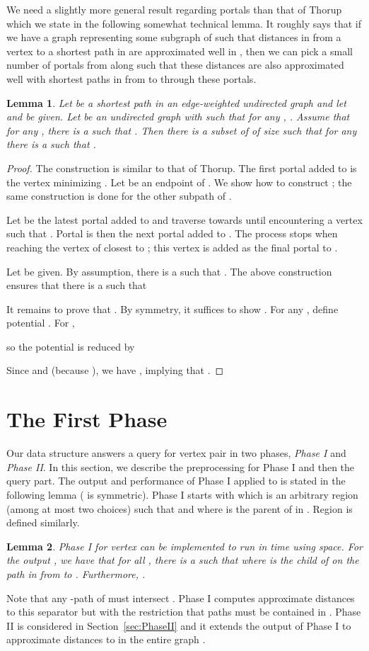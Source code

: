 \documentclass[11pt]{article}
\newtheorem{lemma}{Lemma}
\begin{document}
We need a slightly more general result regarding portals than that of Thorup which we state in the following somewhat technical lemma. It roughly says that if we have a graph  representing some subgraph of  such that distances in  from a vertex  to a shortest path  in  are approximated well in , then we can pick a small number of portals from  along  such that these distances are also approximated well with shortest paths in  from  to  through these portals.
\begin{lemma}\label{Lem:Portal}
Let  be a shortest path in an edge-weighted undirected graph  and let  and  be given. Let  be an undirected graph with  such that for any , . Assume that for any , there is a  such that . Then there is a subset  of  of size  such that for any  there is a  such that .
\end{lemma}
\begin{proof}
The construction is similar to that of Thorup. The first portal  added to  is the vertex  minimizing . Let  be an endpoint of . We show how to construct ; the same construction is done for the other subpath of .

Let  be the latest portal added to  and traverse  towards  until encountering a vertex  such that . Portal  is then the next portal added to . The process stops when reaching the vertex of  closest to ; this vertex is added as the final portal  to .

Let  be given. By assumption, there is a  such that . The above construction ensures that there is a  such that


It remains to prove that . By symmetry, it suffices to show . For any , define potential . For ,

so the potential is reduced by

Since  and  (because ), we have , implying that .
\end{proof}

\section{The First Phase}\label{sec:PhaseI}
Our data structure answers a query for vertex pair  in two phases, \emph{Phase I} and \emph{Phase II}. In this section, we describe the preprocessing for Phase I and then the query part. The output and performance of Phase I applied to  is stated in the following lemma ( is symmetric). Phase I starts with  which is an arbitrary region  (among at most two choices) such that  and  where  is the parent of  in . Region  is defined similarly.
\begin{lemma}\label{Lem:PhaseI}
Phase I for vertex  can be implemented to run in  time using  space. For the output , we have that for all , there is a  such that  where  is the child of  on the path in  from  to . Furthermore, .
\end{lemma}
Note that any -path of  must intersect . Phase I computes approximate distances to this separator but with the restriction that paths must be contained in . Phase II is considered in Section~\ref{sec:PhaseII} and it extends the output of Phase I to approximate distances to  in the entire graph .
\end{document}
